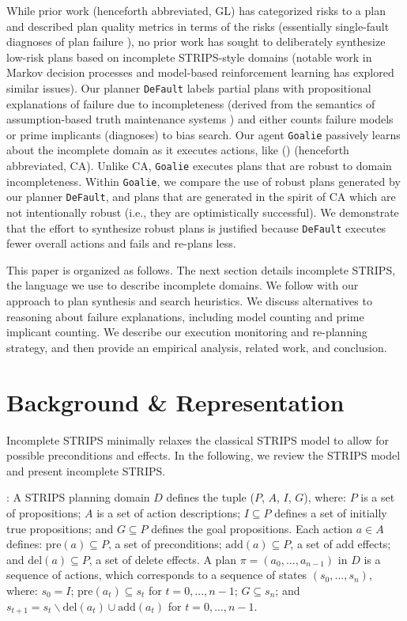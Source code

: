 \documentclass[letterpaper]{article}
\def\und#1{\noindent{\bf #1}:}
\def\default{{\tt DeFault}}
\def\goalie{{\tt Goalie}}
\def\citep#1{\cite{#1}}
\def\citet#1{\citeauthor{#1} (\citeyear{#1})}
\begin{document}
While prior work \citep{Garland02} (henceforth abbreviated, GL) has categorized
risks to a plan and described plan quality metrics in terms of the risks
(essentially single-fault diagnoses of plan failure \citep{dekleer}), no prior
work has sought to deliberately synthesize low-risk plans based on incomplete
STRIPS-style domains (notable work in Markov decision processes
\citep{NE:05,Choudhary15012006}  and model-based reinforcement learning
\citep{citeulike:112017} has explored similar issues).  Our planner \default{} labels partial plans with
propositional explanations of failure due to incompleteness (derived from the
semantics of assumption-based truth maintenance systems \cite{USU-CS-TR-11-001})
and either counts failure models or prime implicants (diagnoses) to bias search.
Our agent \goalie{} passively learns about the incomplete domain as it executes
actions, like \citet{DBLP:conf/aips/ChangA06} (henceforth abbreviated, CA).
Unlike CA, \goalie{} executes plans that are robust to domain
incompleteness.  Within \goalie{}, we compare the use of robust plans generated
by our planner \default{}, and plans that are generated in the spirit of CA
which are not intentionally robust (i.e., they are optimistically successful). 
We demonstrate that the  effort to synthesize robust plans is justified
because \default{} executes fewer overall actions and fails and re-plans less.

This paper is organized as follows.  The next section details incomplete STRIPS,
the language we use to describe incomplete domains.  We follow with our approach
to plan synthesis and search heuristics.  We discuss alternatives to reasoning
about failure explanations, including model counting and prime implicant
counting.  We describe our execution monitoring and re-planning strategy, and
then provide an empirical analysis, related work, and conclusion.
  

\section{Background \& Representation}\label{sec:background}

Incomplete STRIPS minimally relaxes the classical STRIPS model to allow for
possible preconditions and effects.  In the following, we review the STRIPS
model and present incomplete STRIPS.

\und{STRIPS Domains} A STRIPS  \citep{strips} planning domain $D$  defines the
tuple ($P$, $A$, $I$, $G$), where: $P$ is a set of propositions; $A$ is a set of
action descriptions; $I \subseteq P$ defines a set of initially true
propositions; and  $G \subseteq P$ defines the goal propositions.  Each action
$a \in A$ defines: $\text{pre}(a) \subseteq P$, a set of preconditions;
$\text{add}(a) \subseteq P$, a set of add effects; and $\text{del}(a) \subseteq
P$, a set of delete effects. A plan $\pi = (a_0, ..., a_{n-1})$ in $D$ is a
sequence of actions, which corresponds to a sequence of states $(s_0, ...,
s_n)$, where: $s_0 = I$; $\text{pre}(a_t) \subseteq s_t$ for $t = 0,..., n-1$;
$G \subseteq s_n$; and $s_{t+1} = s_t \backslash \text{del}(a_t) \cup
\text{add}(a_t)$ for $t = 0,..., n-1$.
\end{document}
